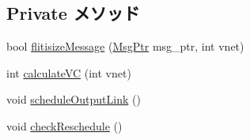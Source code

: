 \subsection*{Private メソッド}
\begin{DoxyCompactItemize}
\item 
bool \hyperlink{classNetworkInterface_a12a9945591ab6cd27b4cf0df84786cf8}{flitisizeMessage} (\hyperlink{classRefCountingPtr}{MsgPtr} msg\_\-ptr, int vnet)
\item 
int \hyperlink{classNetworkInterface_ab27658cc3136de94d2d08c78ac499aff}{calculateVC} (int vnet)
\item 
void \hyperlink{classNetworkInterface_a0b5091af4210988da9a7eeb44e5691e4}{scheduleOutputLink} ()
\item 
void \hyperlink{classNetworkInterface_af954e8e2150e2ce2e1b87081bbd9c678}{checkReschedule} ()
\end{DoxyCompactItemize}
